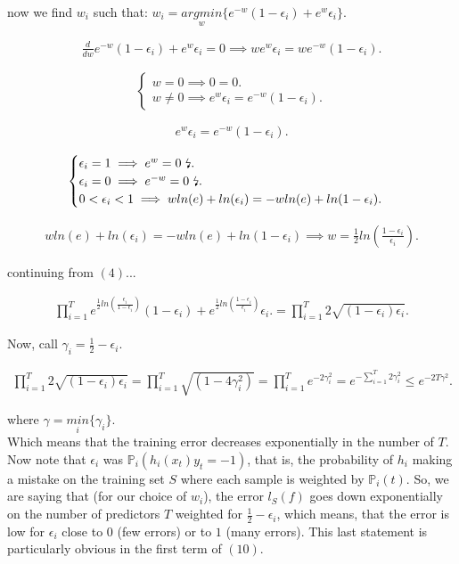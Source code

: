 \documentclass{article}
\begin{document}
now we find $w_i$ such that: $w_i = \underset{w}{argmin} \{ e^{-w}(1-\epsilon_i) + e^{w} \epsilon_i \}$.

\begin{align*}
\frac{d}{dw}e^{-w}(1-\epsilon_i) + e^{w} \epsilon_i = 0 \implies
we^{w}\epsilon_i = we^{-w}(1-\epsilon_i).
\end{align*}

\[
\begin{cases} 
w = 0 \implies 0 = 0.\\
w \neq 0 \implies e^{w}\epsilon_i = e^{-w}(1-\epsilon_i).
\end{cases}
\]

\begin{align*}
e^{w}\epsilon_i = e^{-w}(1-\epsilon_i).
\end{align*}


\[
\begin{cases} 
\epsilon_i = 1 \implies e^{w} = 0 \text{ \lightning}.\\
\epsilon_i = 0 \implies e^{-w} = 0 \text{ \lightning}.\\
0 < \epsilon_i < 1  \implies  w ln(e) + ln(\epsilon_i) = -w ln(e) + ln(1-\epsilon_i).
\end{cases}
\]


\begin{align*}
w ln(e) + ln(\epsilon_i) = -w ln(e) + ln(1-\epsilon_i)\implies
w =  \frac{1}{2}ln(\frac{1-\epsilon_i}{\epsilon_i}).
\end{align*}

continuing from $(4)$... 

\begin{align*}
\prod_{i=1}^{T} e^{\frac{1}{2}ln(\frac{\epsilon_i}{1-\epsilon_i})} (1-\epsilon_i) + e^{\frac{1}{2}ln(\frac{1-\epsilon_i}{\epsilon_i})} \epsilon_i.
= \prod_{i=1}^{T} 2\sqrt{(1-\epsilon_i)\epsilon_i}.
\end{align*}

Now, call $\gamma_i = \frac{1}{2}-\epsilon_i$.

\begin{align*}
\prod_{i=1}^{T} 2\sqrt{(1-\epsilon_i)\epsilon_i} =
\prod_{i=1}^{T} \sqrt{(1-4\gamma_i^2)} = 
\prod_{i=1}^{T} e^{-2\gamma_i^{2}} = 
e^{-\sum_{i=1}^{T} 2\gamma_i^{2}} \leq
e^{-2T\gamma^2}.
\end{align*}

where $\gamma = \underset{i}{min} \{ \gamma_i \}$. \\

Which means that the training error decreases exponentially in the number of $T$.
Now note that $\epsilon_i$ was $\mathbb{P}_i(h_i(x_t) y_t = -1)$, 
that is, the probability of $h_i$ making a mistake on the training set $S$ 
where each sample is weighted by $\mathbb{P}_i(t)$. 
So, we are saying that (for our choice of $w_i$), the error $l_S(f)$ goes down exponentially on the number of predictors $T$
weighted for $\frac{1}{2}-\epsilon_i$, which means, that the error is low for $\epsilon_i$ close to $0$ (few errors) 
or to $1$ (many errors). This last
statement is particularly obvious in the first term of $(10)$.
\end{document}
